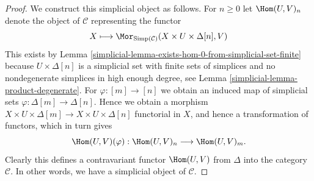\begin{proof}

We construct this simplicial object as follows.
For $n \geq 0$ let $\Hom(U, V)_n$ denote
the object of $\mathcal{C}$ representing the
functor
$$
X
\longmapsto
\Mor_{\text{Simp}(\mathcal{C})}(X \times U \times \Delta[n], V)
$$
This exists by Lemma \ref{simplicial-lemma-exists-hom-0-from-simplicial-set-finite}
because $U \times \Delta[n]$ is a simplicial set with finite
sets of simplices and no nondegenerate simplices in high enough degree,
see Lemma \ref{simplicial-lemma-product-degenerate}.
For $\varphi : [m] \to [n]$ we obtain an induced map of simplicial
sets $\varphi : \Delta[m] \to \Delta[n]$. Hence we obtain a morphism
$X \times U \times \Delta[m] \to X \times U \times \Delta[n]$
functorial in $X$, and hence a transformation of functors,
which in turn gives
$$
\Hom(U, V)(\varphi) :
\Hom(U, V)_n
\longrightarrow
\Hom(U, V)_m.
$$
Clearly this defines a contravariant functor
$\Hom(U, V)$ from
$\Delta$ into the category $\mathcal{C}$.
In other words, we have a simplicial object of $\mathcal{C}$.


\end{proof}
